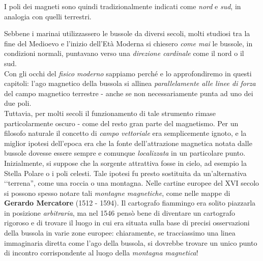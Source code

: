 I poli dei magneti sono quindi tradizionalmente indicati come \textit{nord} e \textit{sud}, in analogia con quelli terrestri.
\begin{digressionwt}
	Sebbene i marinai utilizzassero le bussole da diversi secoli, molti studiosi tra la fine del Medioevo e l'inizio dell'Età Moderna si chiesero \textit{come mai} le bussole, in condizioni normali, puntavano verso una \textit{direzione cardinale} come il nord o il sud.\newline~\\
	Con gli occhi del \textit{fisico moderno} sappiamo perché e lo approfondiremo in questi capitoli: l'ago magnetico della bussola si allinea \textit{parallelamente alle linee di forza} del campo magnetico terrestre - anche se non necessariamente punta ad uno dei due poli.\\
	Tuttavia, per molti secoli il funzionamento di tale strumento rimase particolarmente oscuro - come del resto gran parte del magnetismo. Per un filosofo naturale il concetto di \textit{campo vettoriale} era semplicemente ignoto, e la miglior ipotesi dell'epoca era che la fonte dell'attrazione magnetica notata dalle bussole dovesse essere sempre e comunque \textit{localizzata} in un particolare punto.\newline~\\
	Inizialmente, si suppose che la sorgente attrattiva fosse in cielo, ad esempio la Stella Polare o i poli celesti. Tale ipotesi fu presto sostituita da un'alternativa ‘‘terrena'', come una roccia o una montagna. Nelle cartine europee del XVI secolo si possono spesso notare tali \textit{montagne magnetiche}, come nelle mappe di \textbf{Gerardo Mercatore} (1512 - 1594).
	Il cartografo fiammingo era solito piazzarla in posizione \textit{arbitraria}, ma nel 1546 pensò bene di diventare un cartografo rigoroso e di trovare il luogo in cui era situata sulla base di precisi osservazioni della bussola in varie zone europee: chiaramente, se tracciassimo una linea immaginaria diretta come l'ago della bussola, si dovrebbe trovare un unico punto di incontro corrispondente al luogo della \textit{montagna magnetica}!
	

\end{digressionwt}
